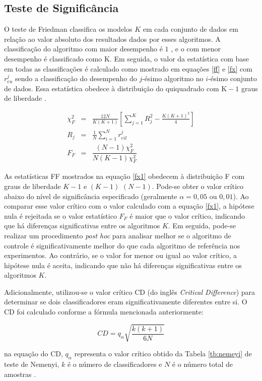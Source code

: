 \subsection{Teste de Signific\^ancia}


O teste de Friedman classifica os modelos $K$ em cada conjunto de dados em relação ao valor absoluto dos resultados dados por esses algoritmos. A classificação do algoritmo com maior desempenho é $1$ , e o com menor desempenho é classificado como $\mathrm{K}$. Em seguida, o valor da estatística com base em todas as classificações é calculado como mostrado em equações \eqref{ff} e \eqref{fx} com $r_{e u}^j$ sendo a classificação do desempenho do $j$-ésimo algoritmo no $i$-ésimo conjunto de dados. Essa estatística obedece à distribuição do quiquadrado com $\mathrm{K}-1$ graus de liberdade \cite{Liu2022}.

\begin{eqnarray}
	\chi_F^2 & =&\frac{12 N}{K(K+1)}\left[\sum_{j=1}^K R_j^2-\frac{K(K+1)^2}{4}\right] \label{ff}\\
	R_j & =&\frac{1}{N} \sum_{i=1}^N r_{e i l}^j \label{fx}\\
	F_F&=&\dfrac{(N-1) \chi_F^2}{N(K-1) \chi_F^2}\label{fx1}
\end{eqnarray}


As estatísticas FF mostrados na equação \eqref{fx1} obedecem à distribuição F com graus de liberdade $K-1$ e $(K-1)$ $(N-1)$. Pode-se obter o valor crítico abaixo do nível de significância especificado (geralmente $\alpha = 0,05$ ou $0,01$). Ao comparar esse valor crítico com o valor calculado com a equação \eqref{fx1}, a hipótese nula é rejeitada se o valor estatístico $F_F$ é maior que o valor crítico, indicando que há diferenças significativas entre os algoritmos $K$. Em seguida, pode-se realizar um procedimento \textit{post hoc} para analisar melhor se o algoritmo de controle é significativamente melhor do que cada algoritmo de referência nos experimentos. Ao contrário, se o valor for menor ou igual ao valor crítico, a hipótese nula é aceita, indicando que não há diferenças significativas entre os algoritmos $K$.


Adicionalmente, utilizou-se o valor crítico CD (do inglês \textit{Critical Difference}) para determinar se dois classificadores eram significativamente diferentes entre si. O CD foi calculado conforme a fórmula mencionada anteriormente:

\begin{equation}
	CD = q_\alpha \sqrt{\frac{k(k+1)}{6N}}
\end{equation}

\noindent na equação do CD, $q_\alpha$ representa o valor crítico obtido da Tabela \ref{tb:nemeyi} de teste de Nemenyi, $k$ é o número de classificadores e $N$ é o número total de amostras \cite{Liu2022}.

